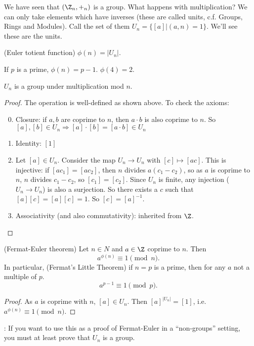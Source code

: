 \documentclass[a4paper]{article}
\begin{document}
  We have seen that $(\Z_n, +_n)$ is a group. What happens with multiplication? We can only take elements which have inverses (these are called units, c.f. Groups, Rings and Modules). Call the set of them $U_n = \{[a] | (a, n) = 1\}$. We'll see these are the units.
  \begin{defi}
    (Euler totient function) $\phi (n) = |U_n|$.
  \end{defi}

  \begin{eg}
    If $p$ is a prime, $\phi(n) = p - 1$. $\phi(4) = 2$.
  \end{eg}

  \begin{prop}
    $U_n$ is a group under multiplication mod $n$.
  \end{prop}

  \begin{proof}
    The operation is well-defined as shown above. To check the axioms:
    \begin{enumerate}[label=\arabic{*}.]
        \setcounter{enumi}{-1}
      \item Closure: if $a, b$ are coprime to $n$, then $a\cdot b$ is also coprime to $n$. So $[a], [b]\in U_n \Rightarrow [a]\cdot [b] = [a\cdot b]\in U_n$
      \item Identity: $[1]$
      \item Let $[a]\in U_n$. Consider the map $U_n \to U_n$ with $[c]\mapsto [ac]$. This is injective: if $[ac_1] = [ac_2]$, then $n $ divides $a(c_1 - c_2)$, so as $a$ is coprime to $n$, $n$ divides $c_1 - c_2$, so $[c_1] = [c_2]$. Since $U_n$ is finite, any injection ($U_n \to U_n$) is also a surjection. So there exists a $c$ such that $[a][c] = [a][c] = 1$. So $[c] = [a]^{-1}$.
      \item Associativity (and also commutativity): inherited from $\Z$.
    \end{enumerate}
  \end{proof}
  \begin{thm}
    (Fermat-Euler theorem) Let $n\in N$ and $a\in \Z$ coprime to $n$. Then
    \[
      a^{\phi(n)} \equiv 1\pmod n.
    \]
    In particular, (Fermat's Little Theorem) if $n = p$ is a prime, then for any $a$ not a multiple of $p$.
    \[
      a^{p - 1}\equiv 1\pmod p.
    \]
  \end{thm}

  \begin{proof}
    As $a$ is coprime with $n$, $[a]\in U_n$. Then $[a]^{|U_n|} = [1]$, i.e. $a^{\phi(n)} \equiv 1\pmod n$.
  \end{proof}
  \note: If you want to use this as a proof of Fermat-Euler in a ``non-groups'' setting, you must at least prove that $U_n$ is a group.
\end{document}
